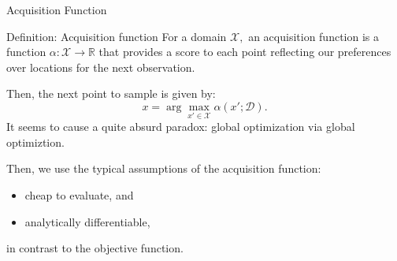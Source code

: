 \documentclass[9pt]{beamer}
\begin{document}
\begin{frame}{Acquisition Function}
  \begin{block}{Definition: Acquisition function}
    For a domain $\mathcal{X},$ an acquisition function is a function $\alpha: \mathcal{X} \rightarrow \mathbb{R}$ that
    provides a score to each point reflecting our preferences over locations for the next observation.
  \end{block}
  \vspace{1.0em}
  Then, the next point to sample is given by:
  \[
    x = \arg\max_{x' \in \mathcal{X}} \alpha(x'; \mathcal{D}).
  \]
  It seems to cause a quite absurd paradox: global optimization via global optimiztion.

  \vspace{1.0em}
  Then, we use the typical assumptions of the acquisition function:
    \begin{itemize}
        \item cheap to evaluate, and
        \item analytically differentiable,
    \end{itemize}
  in contrast to the objective function.
\end{frame}

\end{document}
